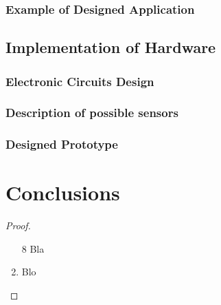 \documentclass[twoside]{ctuthesis}
\theoremstyle{plain}
\theoremstyle{definition}
\theoremstyle{note}
\begin{document}
\subsection{Example of Designed Application}
\section{Implementation of Hardware}
\subsection{Electronic Circuits Design}
\subsection{Description of possible sensors}
\subsection{Designed Prototype}
\chapter{Conclusions}


\medskip

\begin{proof}\begin{enumerate} \item[8] Bla \item Blo \end{enumerate} \end{proof}

\appendix

\printindex

\appendix

%



\end{document}
